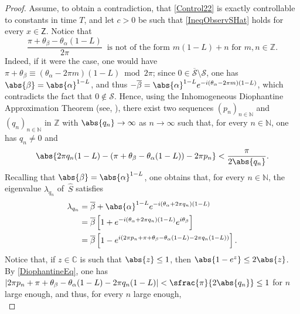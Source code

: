 \begin{proof}
Assume, to obtain a contradiction, that \eqref{Control22} is exactly controllable to constants in time $T$, and let $c > 0$ be such that \eqref{IneqObservSHat} holds for every $x \in \mathsf Z$. Notice that
\begin{equation}\label{eq:mn}
\frac{\pi + \theta_\beta - \theta_\alpha(1 - L)}{2 \pi}\ \text{ is not of the form } m (1 - L) + n \text{ for } m, n \in \mathbb Z.
\end{equation}
Indeed, if it were the case, one would have $\pi + \theta_\beta \equiv (\theta_\alpha - 2 \pi m) (1 - L) \bmod 2 \pi$; since $0 \in \overline{\mathcal S} \setminus \mathcal S$, one has $\abs{\beta} = \abs{\alpha}^{1 - L}$, and thus $-\overline\beta = \abs{\alpha}^{1 - L} e^{- i (\theta_\alpha - 2 \pi m) (1 - L)}$, which contradicts the fact that $0 \notin \mathcal S$. Hence, using the Inhomogeneous Diophantine Approximation Theorem (see, \eg \cite[Chap.\,III, Th.\,II\,A]{Cassels1957Introduction}), there exist two sequences $(p_n)_{n \in \mathbb N}$ and $(q_n)_{n \in \mathbb N}$ in $\mathbb Z$ with $\abs{q_n} \to \infty$ as $n \to \infty$ such that, for every $n \in \mathbb N$, one has $q_n \neq 0$ and
\begin{equation}
\label{DiophantineEq}
\abs{2 \pi q_n (1 - L) - (\pi + \theta_\beta - \theta_\alpha (1 - L)) - 2 \pi p_n} < \frac{\pi}{2 \abs{q_n}}.
\end{equation}
Recalling that $\abs{\beta} = \abs{\alpha}^{1 - L}$, one obtains that, for every $n \in \mathbb N$, the eigenvalue $\lambda_{q_n}$ of~$\widehat S$ satisfies
\begin{equation}
\label{LambdaN}
\begin{aligned}
\lambda_{q_n} & = \overline\beta + \abs{\alpha}^{1 - L} e^{- i (\theta_\alpha + 2 \pi q_n)(1 - L)} \\
& = \overline\beta\left[1 + e^{-i(\theta_\alpha + 2 \pi q_n)(1 - L)} e^{i \theta_\beta}\right] \\
& = \overline\beta\left[1 - e^{i (2 \pi p_n + \pi + \theta_\beta - \theta_\alpha(1 - L) - 2 \pi q_n (1 - L))}\right].
\end{aligned}
\end{equation}
Notice that, if $z \in \mathbb C$ is such that $\abs{z} \leq 1$, then $\abs{1 - e^z} \leq 2 \abs{z}$. By \eqref{DiophantineEq}, one has $\lvert 2 \pi p_n + \pi + \theta_\beta - \theta_\alpha(1 - L) - 2 \pi q_n (1 - L) \rvert < \sfrac{\pi}{2 \abs{q_n}} \leq 1$ for $n$ large enough, and thus, for every $n$ large enough,
\begin{equation}
\label{EstimLambdaN}

\end{equation}
\end{proof}
